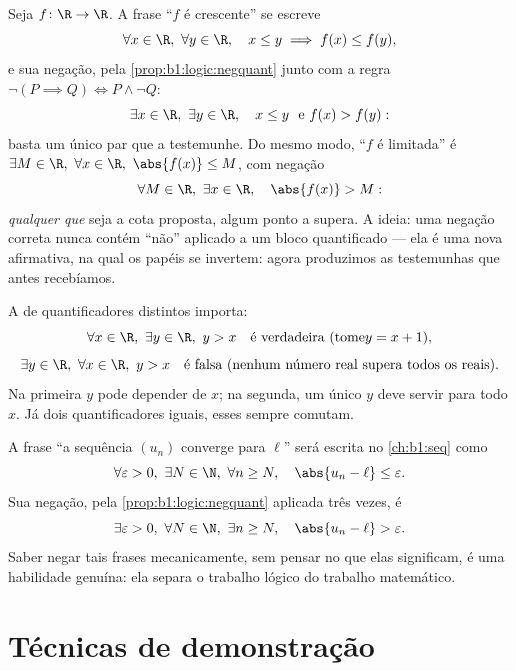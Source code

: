 \begin{example}\label{ex:b1:logic:negpractice}
Seja $f \colon \R \to \R$. A frase ``$f$ é crescente'' se escreve
\[
\forall x \in \R,\ \forall y \in \R,\quad
x \leq y \implies f(x) \leq f(y) ,
\]
e sua negação, pela \cref{prop:b1:logic:negquant} junto com a regra
$\lnot(P \implies Q) \iff P \land \lnot Q$:
\[
\exists x \in \R,\ \exists y \in \R,\quad
x \leq y \ \text{ e}\ f(x) > f(y) :
\]
basta um único par que a testemunhe. Do mesmo modo, ``$f$ é limitada'' é
$\exists M \in \R,\ \forall x \in \R,\ \abs{f(x)} \leq M$, com
negação
\[
\forall M \in \R,\ \exists x \in \R,\quad \abs{f(x)} > M :
\]
\emph{qualquer que} seja a cota proposta, algum ponto a supera. A
ideia: uma negação correta nunca contém ``não'' aplicado a um
bloco quantificado --- ela é uma nova  afirmativa, na qual os
papéis se invertem: agora produzimos as testemunhas que antes
recebíamos.
\end{example}

\begin{example}\label{ex:b1:logic:order}
A  de quantificadores distintos importa:
\[
\forall x \in \R,\ \exists y \in \R,\ y > x
\quad\text{é verdadeira (tome} y = x+1\text{),}
\]
\[
\exists y \in \R,\ \forall x \in \R,\ y > x
\quad\text{é falsa (nenhum número real supera todos os reais).}
\]
Na primeira  $y$ pode depender de $x$; na segunda, um único
$y$ deve servir para todo $x$. Já dois quantificadores iguais, esses
sempre comutam.
\end{example}

\begin{example}\label{ex:b1:logic:limit}
A frase ``a sequência $(u_n)$ converge para $\ell$'' será escrita no
\cref{ch:b1:seq} como
\[
\forall \varepsilon > 0,\ \exists N \in \N,\ \forall n \geq N,\quad
\abs{u_n - \ell} \leq \varepsilon .
\]
Sua negação, pela \cref{prop:b1:logic:negquant} aplicada três vezes, é
\[
\exists \varepsilon > 0,\ \forall N \in \N,\ \exists n \geq N,\quad
\abs{u_n - \ell} > \varepsilon .
\]
Saber negar tais frases mecanicamente, sem pensar no que elas significam,
é uma habilidade genuína: ela separa o trabalho lógico do trabalho
matemático.
\end{example}

\section{Técnicas de demonstração}

